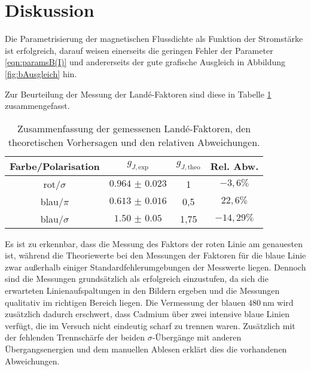 \section{Diskussion}
\label{sec:Diskussion}

Die Parametrisierung der magnetischen Flussdichte als Funktion der Stromstärke ist erfolgreich, darauf weisen einerseits die geringen Fehler der Parameter \eqref{eqn:paramsB(I)} und andererseits der gute grafische Ausgleich in Abbildung \ref{fig:bAusgleich} hin.

Zur Beurteilung der Messung der Landé-Faktoren sind diese in Tabelle \ref{tab:zusammenfassung} zusammengefasst.

\begin{table}[htp]
	\begin{center}
    \caption{Zusammenfassung der gemessenen Landé-Faktoren, den theoretischen Vorhersagen und den relativen Abweichungen.}
    \label{tab:zusammenfassung}
		\begin{tabular}{cccc}
		\toprule
			{Farbe/Polarisation} & {$g_{J,\text{exp}}$} & {$g_{J,\text{theo}}$} & {Rel. Abw.}\\
			\midrule
			 rot/$\sigma$  & $\num{0.964(23)}$ & 1 & $-3{,}6\%$\\
			 blau/$\pi$    & $\num{0.613(16)}$ & 0,5 & $22{,}6\%$\\
       blau/$\sigma$ &  $\num{1.50(5)}$  & 1,75 & $-14{,}29\%$\\
		\bottomrule
		\end{tabular}
	\end{center}
\end{table}

Es ist zu erkennbar, dass die Messung des Faktors der roten Linie am genauesten ist, während die Theoriewerte bei den Messungen der Faktoren für die blaue Linie zwar außerhalb einiger Standardfehlerumgebungen der Messwerte liegen. Dennoch sind die Messungen grundsätzlich als erfolgreich einzustufen, da sich die erwarteten Linienaufspaltungen in den Bildern ergeben und die Messungen qualitativ im richtigen Bereich liegen. Die Vermessung der blauen $\SI{480}{\nano\meter}$ wird zusätzlich dadurch erschwert, dass Cadmium über zwei intensive blaue Linien verfügt, die im Versuch nicht eindeutig scharf zu trennen waren. Zusätzlich mit der fehlenden Trennschärfe der beiden $\sigma$-Übergänge mit anderen Übergangsenergien und dem manuellen Ablesen erklärt dies die vorhandenen Abweichungen.
